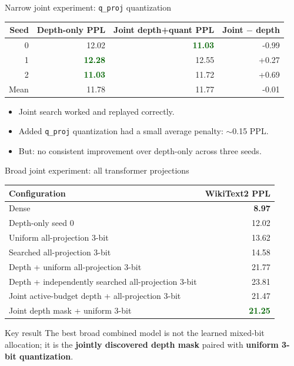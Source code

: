 \documentclass[aspectratio=169]{beamer}
\newcommand{\good}[1]{\textcolor{darkgreen}{\textbf{#1}}}
\begin{document}
\begin{frame}{Narrow joint experiment: \texttt{q\_proj} quantization}
\begin{table}
\centering
\begin{tabular}{rrrr}
\toprule
Seed & Depth-only PPL & Joint depth+quant PPL & Joint $-$ depth \\
\midrule
0 & 12.02 & \good{11.03} & -0.99 \\
1 & \good{12.28} & 12.55 & +0.27 \\
2 & \good{11.03} & 11.72 & +0.69 \\
\midrule
Mean & 11.78 & 11.77 & -0.01 \\
\bottomrule
\end{tabular}
\end{table}

\vspace{0.2cm}
\begin{itemize}
    \item Joint search worked and replayed correctly.
    \item Added \texttt{q\_proj} quantization had a small average penalty: $\sim$0.15 PPL.
    \item But: no consistent improvement over depth-only across three seeds.
\end{itemize}
\end{frame}


\begin{frame}{Broad joint experiment: all transformer projections}
\begin{table}
\centering
\begin{tabular}{lr}
\toprule
Configuration & WikiText2 PPL \\
\midrule
Dense & \textbf{8.97} \\
Depth-only seed 0 & 12.02 \\
Uniform all-projection 3-bit & 13.62 \\
Searched all-projection 3-bit & 14.58 \\
Depth + uniform all-projection 3-bit & 21.77 \\
Depth + independently searched all-projection 3-bit & 23.81 \\
Joint active-budget depth + all-projection 3-bit & 21.47 \\
Joint depth mask + uniform 3-bit & \good{21.25} \\
\bottomrule
\end{tabular}
\end{table}

\begin{block}{Key result}
The best broad combined model is not the learned mixed-bit allocation; it is the \textbf{jointly discovered depth mask} paired with \textbf{uniform 3-bit quantization}.
\end{block}
\end{frame}
\end{document}

